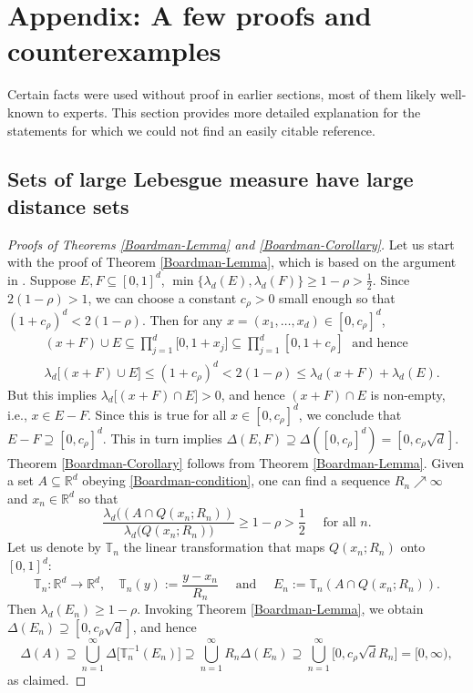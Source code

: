 \documentclass[a4paper,11pt]{amsart}
\numberwithin{equation}{section}
\begin{document}
 \section{Appendix: A few proofs and counterexamples} \label{Appendix-1}
Certain facts were used without proof in earlier sections, most of them likely well-known to experts. This section provides more detailed explanation for the statements for which we could not find an easily citable reference. 
 \subsection{Sets of large Lebesgue measure have large distance sets} \label{Appendix-1-large-distance-sets}
\begin{proof}[Proofs of Theorems \ref{Boardman-Lemma} and \ref{Boardman-Corollary}]
Let us start with the proof of Theorem \ref{Boardman-Lemma}, which is based on the argument in \cite[Lemma II]{Boardman-1970}. Suppose $E, F \subseteq [0,1]^d$, $\min \{\lambda_d(E), \lambda_d(F) \} \geq 1 -\rho > \frac12$. Since $2(1-\rho) > 1$, we can choose a constant $c_{\rho} >0$ small enough so that $(1 + c_{\rho})^d < 2(1 - \rho)$. Then for any $x = (x_1, \ldots, x_d) \in [0, c_{\rho}]^d$, 
\begin{align*} &(x + F) \cup E \subseteq \prod_{j=1}^{d} \bigl[0, 1 + x_j \bigr] \subseteq \prod_{j=1}^{d} [0, 1+c_{\rho}] \; \text{ and hence } \\ 
&\lambda_d \bigl[(x + F) \cup E \bigr] \leq (1 + c_{\rho})^d < 2(1 - \rho) \leq \lambda_d(x + F) + \lambda_d(E).     \end{align*}
But this implies $\lambda_d \bigl[ (x + F) \cap E \bigr] > 0$, and hence $(x + F) \cap E$ is non-empty, i.e., $x \in E-F$.  Since this is true for all $x \in [0, c_{\rho}]^d$, we conclude that $E - F \supseteq [0, c_{\rho}]^d$. This in turn implies $\Delta(E, F) \supseteq \Delta ([0, c_{\rho}]^d) = [0, c_{\rho}\sqrt{d}]$. 
\vskip0.1in
\noindent Theorem \ref{Boardman-Corollary} follows from Theorem \ref{Boardman-Lemma}. Given a set $A \subseteq \mathbb R^d$ obeying \eqref{Boardman-condition}, one can find a sequence $R_n \nearrow \infty$ and $x_n \in \mathbb R^d$ so that 
\[ \frac{\lambda_d((A \cap Q(x_n;R_n))}{\lambda_d \bigl(Q(x_n;R_n) \bigr)} \geq  1 - \rho > \frac12 \quad \text{ for all $n$.} \]  
Let us denote by $\mathbb T_n$ the linear transformation that maps $Q(x_n; R_n)$ onto $[0,1]^d$: \[ \mathbb T_n: \mathbb R^d \rightarrow \mathbb R^d, \quad  \mathbb T_n(y) := \frac{y - x_n}{R_n} \quad \text{ and } \quad E_n := \mathbb T_n(A \cap Q(x_n;R_n)). \]   
 Then $\lambda_d(E_n) \geq 1 -\rho$. Invoking Theorem \ref{Boardman-Lemma}, we obtain $ \Delta(E_n) \supseteq [0, c_{\rho}\sqrt{d}]$, and hence
\[ \Delta(A) \supseteq \bigcup_{n=1}^{\infty} \Delta \bigl[\mathbb T_n^{-1}(E_n) \bigr] \supseteq \bigcup_{n=1}^{\infty} R_n \Delta(E_n)  \supseteq \bigcup_{n=1}^{\infty} \bigl[0, c_{\rho} \sqrt{d} R_n\bigr] = [0, \infty), \] 
as claimed. 
\end{proof} 
\end{document}
